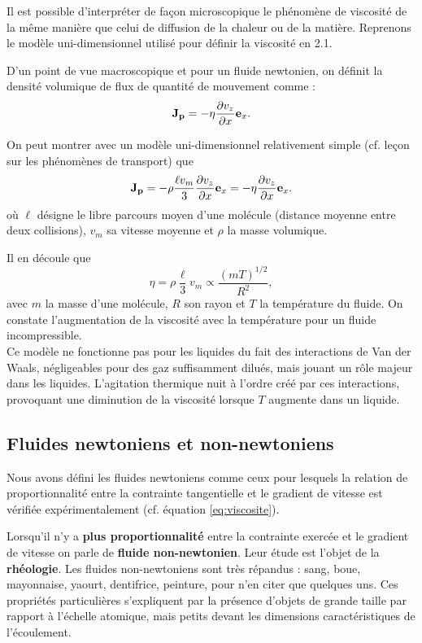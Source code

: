 \documentclass[11pt,a4paper]{report}
\begin{document}
Il est possible d'interpréter de façon microscopique le phénomène de viscosité de la même manière que celui de diffusion de la chaleur ou de la matière. 
Reprenons le modèle uni-dimensionnel utilisé pour définir la viscosité en 2.1.

D'un point de vue macroscopique et pour un fluide newtonien, on définit la densité volumique de flux de quantité de mouvement comme :
\begin{equation}
	\bold{J}_\bold{p} = - \eta\frac{\partial v_z}{\partial x}\bold{e}_x.
\end{equation}

On peut montrer avec un modèle uni-dimensionnel relativement simple (cf. leçon sur les phénomènes de transport) que
\begin{equation}
	\bold{J}_\bold{p} = - \rho\frac{\ell v_m}{3}\frac{\partial v_z}{\partial x}\bold{e}_x = -\eta \frac{\partial v_z}{\partial x}\bold{e}_x.
\end{equation}
où $\ell$ désigne le libre parcours moyen d'une molécule (distance moyenne entre deux collisions), $v_m$ sa vitesse moyenne et $\rho$ la masse volumique.

Il en découle que 
\begin{equation}
	\eta = \rho \frac{\ell}{3}v_m \propto \frac{\left(mT\right)^{1/2}}{R^2},
\end{equation}
avec $m$ la masse d'une molécule, $R$ son rayon et $T$ la température du fluide. 
On constate l'augmentation de la viscosité avec la température pour un fluide incompressible.\\

Ce modèle ne fonctionne pas pour les liquides du fait des interactions de Van der Waals, négligeables pour des gaz suffisamment dilués, mais jouant un rôle majeur dans les liquides. L'agitation thermique nuit à l'ordre créé par ces interactions, provoquant une diminution de la viscosité lorsque $T$ augmente dans un liquide.

\subsection{Fluides newtoniens et non-newtoniens}

Nous avons défini les fluides newtoniens comme ceux pour lesquels la relation de proportionnalité entre la contrainte tangentielle et le gradient de vitesse est vérifiée expérimentalement (cf. équation \eqref{eq:viscosite}).

Lorsqu'il n'y a \textbf{plus proportionnalité} entre la contrainte exercée et le gradient de vitesse on parle de \textbf{fluide non-newtonien}. 
Leur étude est l'objet de la \textbf{rhéologie}. Les fluides non-newtoniens sont très répandus : sang, boue, mayonnaise, yaourt, dentifrice, peinture, pour n'en citer que quelques uns. Ces propriétés particulières s'expliquent par la présence d'objets de grande taille par rapport à l'échelle atomique, mais petits devant les dimensions caractéristiques de l'écoulement.
\end{document}
